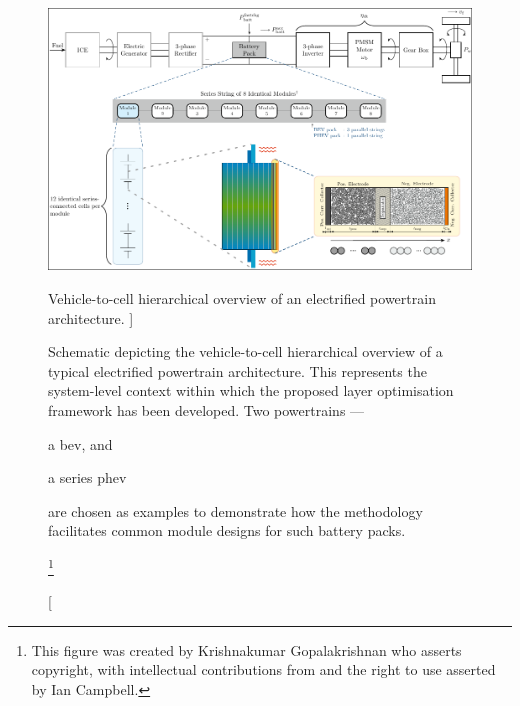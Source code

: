 

\begin{figure}[!bp]
    \begin{minipage}[t]{\textwidth}
        \centering
        \includegraphics[width=\textwidth]{hierarchical_powertrain_to_cell_layer.pdf}
        \caption
        [%
        Vehicle-to-cell hierarchical  overview of  an electrified powertrain architecture.
        ]%
        {%
            Schematic  depicting   the  vehicle-to-cell  hierarchical   overview  of
            a  typical   electrified  powertrain   architecture.  This   represents  the
            system-level context within which  the proposed layer optimisation framework
            has been developed. Two  powertrains ---
            \begin{enumerate*}[label=\itshape\alph*\upshape)]
                \item  a \gls{bev}, and
                \item  a series \gls{phev}
            \end{enumerate*}
            are  chosen as  examples  to demonstrate  how  the methodology  facilitates
            common module designs for such battery packs\footnotemark.
        }%
        \label{fig:fig_PowertrainSchematic}
        \mpfootnotes[1]
        \footnote{This  figure was  created by  Krishnakumar Gopalakrishnan  who
            asserts copyright, with intellectual contributions from and the right to
        use asserted by Ian Campbell.}
    \end{minipage}
\end{figure}

